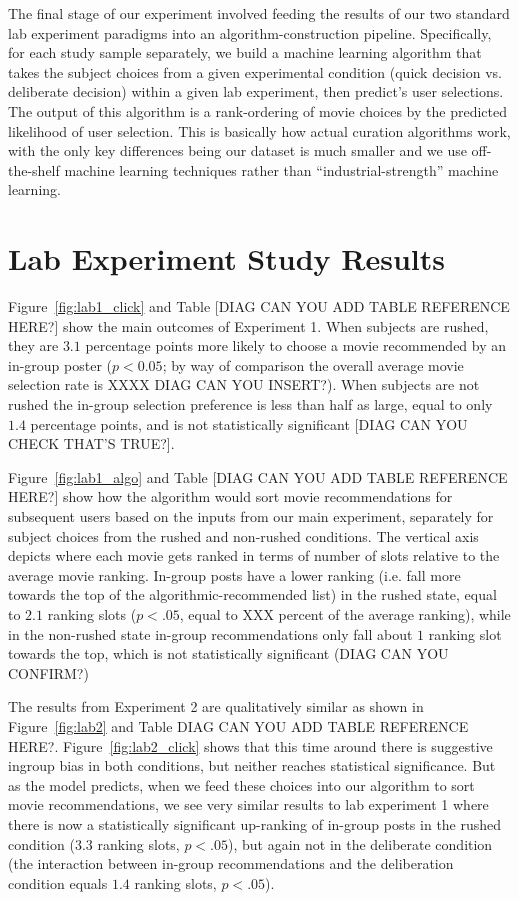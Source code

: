 \documentclass[12pt,letterpaper]{article}
\begin{document}
The final stage of our experiment involved feeding the results of our two standard lab experiment paradigms into an algorithm-construction pipeline. Specifically, for each study sample separately, we build a machine learning algorithm that takes the subject choices from a given experimental condition (quick decision vs. deliberate decision) within a given lab experiment, then predict's user selections. The output of this algorithm is a rank-ordering of movie choices by the predicted likelihood of user selection. This is basically how actual curation algorithms work, with the only key differences being our dataset is much smaller and we use off-the-shelf machine learning techniques rather than ``industrial-strength'' machine learning.

\section {Lab Experiment Study Results}
Figure~\ref{fig:lab1_click} and Table [DIAG CAN YOU ADD TABLE REFERENCE HERE?] show the main outcomes of  Experiment 1.  When subjects are rushed, they are $3.1$ percentage points more likely to choose a movie recommended by an in-group poster ($p<0.05$; by way of comparison the overall average movie selection rate is XXXX DIAG CAN YOU INSERT?). When subjects are not rushed the in-group selection preference is less than half as large, equal to only $1.4$ percentage points, and is not statistically significant [DIAG CAN YOU CHECK THAT'S TRUE?].   

Figure~\ref{fig:lab1_algo} and Table [DIAG CAN YOU ADD TABLE REFERENCE HERE?] show how the algorithm would sort movie recommendations for subsequent users based on the inputs from our main experiment, separately for subject choices from the rushed and non-rushed conditions.  The vertical axis depicts where each movie gets ranked in terms of number of slots relative to the average movie ranking. In-group posts have a lower ranking (i.e. fall more towards the top of the algorithmic-recommended list) in the rushed state, equal to $2.1$ ranking slots ($p<.05$, equal to XXX percent of the average ranking), while in the non-rushed state in-group recommendations only fall about $1$ ranking slot towards the top, which is not statistically significant (DIAG CAN YOU CONFIRM?) 

The results from Experiment 2 are qualitatively similar as shown in Figure~\ref{fig:lab2} and Table DIAG CAN YOU ADD TABLE REFERENCE HERE?. Figure~\ref{fig:lab2_click} shows that this time around there is suggestive ingroup bias in both conditions, but neither reaches statistical significance. But as the model predicts, when we feed these choices into our algorithm to sort movie recommendations, we see very similar results to lab experiment 1 where there is now a statistically significant up-ranking of in-group posts in the rushed condition ($3.3$ ranking slots, $p<.05$), but again not in the deliberate condition (the interaction between in-group recommendations and the deliberation condition equals $1.4$ ranking slots, $p<.05$).
\end{document}
